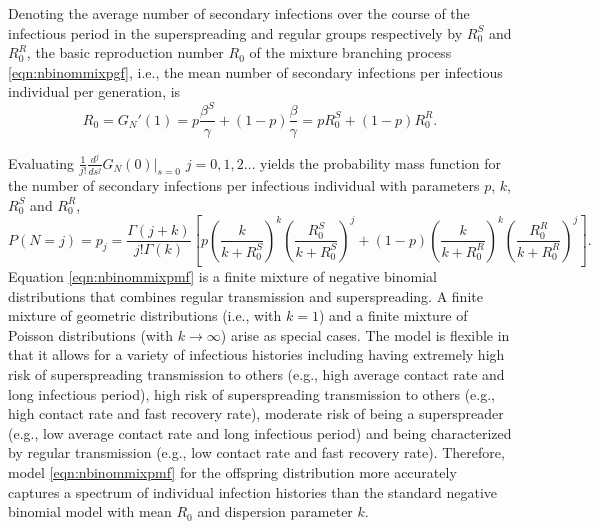 \documentclass{imammb}
\numberwithin{equation}{section}
\begin{document}
Denoting the average number of secondary infections over the course of the infectious period in the superspreading and regular groups respectively by $R_0^S$ and $R_0^R$, the basic reproduction number $R_0$ of the mixture branching process \eqref{eqn:nbinommixpgf}, i.e., the mean number of secondary infections per infectious individual per generation, is  
\begin{equation}\label{eqn:R0}
   R_0= G_N'(1) = p\frac{ \beta^S }{\gamma } +(1-p)\frac{ \beta }  {\gamma  } = p R_0^S + (1-p) R_0^R.%
\end{equation}

Evaluating $\frac{1}{j!} \frac{d^j}{ds^j} G_N(0) |_{s=0}$ $j=0,1,2\dots$ yields the probability mass function for the number of secondary infections per infectious individual with parameters $p$, $k$, $R_0^S$ and $R_0^R$,
\begin{equation}\label{eqn:nbinommixpmf}
    P(N=j) = p_j = \frac{\Gamma(j+k)}{j! \Gamma (k)} \left [ p \left(\frac{k}{k+R_0^S} \right)^{k}\left (\frac{R_0^S}{k+R_0^S} \right )^j+ (1-p) \left(\frac{k}{k+R_0^R} \right)^{k}\left (\frac{R_0^R}{k+R_0^R} \right )^j \right ].
\end{equation}
Equation \eqref{eqn:nbinommixpmf} is a finite mixture of negative binomial distributions that combines regular transmission and superspreading. A finite mixture of geometric distributions (i.e., with $k=1$) and a finite mixture of Poisson distributions (with $k\rightarrow \infty$) arise as special cases. %
The model is flexible in that it allows for a variety of infectious histories including having extremely high risk of superspreading transmission to others (e.g., high average contact rate and long infectious period), high risk of superspreading transmission to others (e.g., high contact rate and fast recovery rate), moderate risk of being a superspreader (e.g., low average contact rate and long infectious period) and being characterized by regular transmission (e.g., low contact rate and fast recovery rate). Therefore, model \eqref{eqn:nbinommixpmf} for the offspring distribution more accurately captures a spectrum of individual infection histories than the standard negative binomial model with mean $R_0$ and dispersion parameter $k$. 
\end{document}
